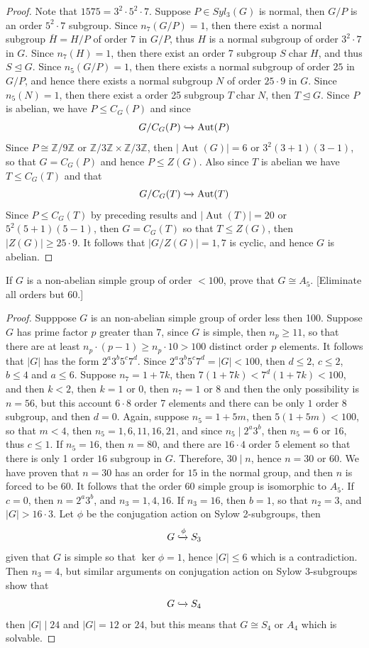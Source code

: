 \documentclass{article}
\newcommand{\Z}{\mathbb{Z}}
\newenvironment{problem}[2][Problem]{\begin{trivlist}
\item[\hskip \labelsep {\bfseries #1}\hskip \labelsep {\bfseries #2.}]}{\end{trivlist}}
\DeclareMathOperator{\Aut}{Aut}
\DeclareMathOperator{\Char}{char}
\begin{document}
\begin{proof}
    Note that $1575 = 3^2\cdot 5^2 \cdot 7$. Suppose $P\in Syl_3(G)$ is normal, then $G/P$ is an order $5^2 \cdot 7$ subgroup. Since $n_7(G/P)=1$, then there exist a normal subgroup $\overline{H}=H/P$ of order $7$ in $G/P$, thus $H$ is a normal subgroup of order $3^2 \cdot 7$ in $G$. Since $n_7(H)=1$, then there exist an order 7 subgroup $S \Char H$, and thus $S\trianglelefteq G$. Since $n_5(G/P)=1$, then there exists a normal subgroup of order $25$ in $G/P$, and hence there exists a normal subgroup $N$ of order $25 \cdot 9$ in $G$. Since $n_5(N)=1$, then there exist a order 25 subgroup $T \Char N$, then $T\trianglelefteq G$. Since $P$ is abelian, we have $P\leq C_G(P)$ and since 
    \[
            G/C_G(P) \xhookrightarrow{} \Aut(P)
    \]
    Since $P\cong \Z/9\Z$ or $\Z/3\Z\times \Z/3\Z$, then $|\Aut(G)|=6$ or $3^2(3+1)(3-1)$, so that $G=C_G(P)$ and hence $P\leq Z(G)$. Also since $T$ is abelian we have $T\leq C_G(T)$ and that 
    \[
        G/C_G(T) \xhookrightarrow{} \Aut(T)
    \]
    Since $P\leq C_G(T)$ by preceding results and $|\Aut(T)| = 20$ or $5^2(5+1)(5-1)$, then $G=C_G(T)$ so that $T\leq Z(G)$, then $|Z(G)|\geq 25 \cdot 9$. It follows that $|G/Z(G)|=1, 7$ is cyclic, and hence $G$ is abelian. 
\end{proof}
\begin{problem}{29}
        If $G$ is a non-abelian simple group of order $< 100$, prove that $G \cong A_5$. [Eliminate all orders but 60.]
\end{problem}
\begin{proof}
    Supppose $G$ is an non-abelian simple group of order less then 100. Suppose $G$ has prime factor $p$ greater than $7$, since $G$ is simple, then $n_p\geq 11$, so that there are at least $n_p\cdot (p-1)\geq n_p\cdot 10>100$ distinct order $p$ elements. It follows that $|G|$ has the form $2^a3^b5^c7^d$. Since $2^a3^b5^c7^d=|G|<100$, then $d\leq 2 $, $c \leq 2$, $b\leq 4$ and $a \leq 6$. Suppose $n_7=1+7k$, then $7(1+7k)<7^d(1+7k)<100$, and then $k<2$, then $k=1$ or $0$, then $n_{7} = 1$ or $8$ and then the only possibility is  $n=56$, but this account $6 \cdot 8$ order 7 elements and there can be only $1$ order 8 subgroup, and then $d=0$. Again, suppose $n_5=1+5m$, then $5(1+5m)<100$, so that $m<4$, then $n_5=1, 6, 11, 16, 21$, and since $n_5\mid 2^a3^b$, then $n_5=6$ or $16$, thus $c\leq 1$. If $n_5=16$, then $n=80$, and there are $16 \cdot 4$ order $5$ element so that there is only 1 order $16$ subgroup in $G$. Therefore, $30\mid n$, hence $n=30$ or $60$. We have proven that $n=30$ has an order for $15$ in the normal group, and then $n$ is forced to be $60$. It follows that the order 60 simple group is isomorphic to $A_5$. If $c=0$, then $n=2^a3^b$, and $n_3=1, 4, 16$. If $n_3=16$, then $b=1$, so that $n_2=3$, and $|G|>16\cdot 3$. Let $\phi$ be the conjugation action on Sylow 2-subgroups, then 
    \[
        G \xhookrightarrow{\phi} S_3
    \]
    given that $G$ is simple so that $\ker \phi=1$, hence $|G|\leq 6$ which is a contradiction. Then $n_3=4$, but similar arguments on conjugation action on Sylow 3-subgroups show that 
    \[
        G \xhookrightarrow{} S_4
    \]
    then $|G|\mid 24$ and $|G|=12$ or $24$, but this means that $G \cong S_4$ or $A_4$ which is solvable.  
\end{proof}
\end{document}
